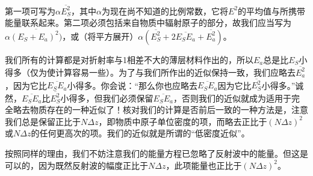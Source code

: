 第一项可写为$\alpha\overline{E_S^2}$，其中$\alpha$为现在尚不知道的比例常数，它将$E^2$的平均值与所携带能量联系起来。第二项必须包括来自物质中辐射原子的部分，故我们应当写为$\alpha\overline{(E_S+E_a)^2)}$，或（将平方展开）$\alpha(\overline{E_S^2} + 2\overline{E_SE_a} + \overline{E_a^2})$。

我们所有的计算都是对折射率与1相差不大的薄层材料作出的，所以$E_a$总是比$E_S$小得多（仅为使计算容易一些）。为了与我们所作出的近似保持一致，我们应略去$\overline{E_a^2}$，因为它比$\overline{E_SE_a}$小得多。你会说：“那么你也应略去$\overline{E_SE_a}$因为它比$\overline{E_S^2}$小得多。”诚然，$\overline{E_SE_a}$比$\overline{E_S^2}$小得多，但我们必须保留$\overline{E_SE_a}$，否则我们的近似就成为适用于完全略去物质存在的一种近似了！核对我们的计算是否前后一致的一种方法是，注意我们总是保留正比于$N\Delta z$，即物质中原子单位密度的项，而略去正比于$(N\Delta z)^2$或$N\Delta z$的任何更高次的项。我们的近似就是所谓的“低密度近似”。

按照同样的理由，我们不妨注意我们的能量方程已忽略了反射波中的能量。但这是可以的，因为既然反射波的幅度正比于$N\Delta z$，此项能量也正比于$(N\Delta z)^2$。


